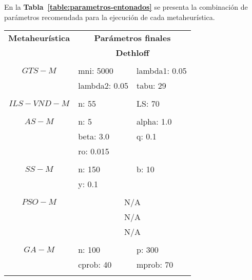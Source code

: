En la \textbf{Tabla~\ref{table:parametros-entonados}} se presenta la combinación de parámetros recomendada para la ejecución de cada metaheurística.\\


\begin{table}[h]
\centering
\caption{Parámetros finales}
\label{table:parametros-entonados}
\begin{minipage}[ht]{0.386\linewidth}
\begin{table}[H]
\centering
\footnotesize
\begin{tabular}{c || ll}
\hline\hline
\textbf{Metaheurística} & \multicolumn{2}{c|}{\textbf{Parámetros finales}}\\
						& \multicolumn{2}{c|}{\textbf{Dethloff}}\\
\hline\hline\\
\emph{$GTS-M$} & mni: 5000     & lambda1: 0.05\\  
			& lambda2: 0.05 & tabu: 29      \\ [0.7ex]\cline{2-3}\\
\emph{$ILS-VND-M$} & n: 55 & LS: 70  \\ [0.7ex]\cline{2-3}\\
\emph{$AS-M$} & n: 5 		& alpha: 1.0 	\\  
			& beta: 3.0 & q: 0.1		\\
			& ro: 0.015 &	 			\\ [0.7ex]\cline{2-3}\\
\emph{$SS-M$} & n: 150 & b: 10 \\  
			& y: 0.1 & 		 \\ [0.7ex]\cline{2-3}\\
\emph{$PSO-M$} & \multicolumn{2}{c}{N/A} \\
			& \multicolumn{2}{c}{N/A} \\
			& \multicolumn{2}{c}{N/A} \\ [0.7ex]\cline{2-3}\\
\emph{$GA-M$} & n: 100    & p: 300  	 \\  
		   & cprob: 40 & mprob: 70   \\
\\ \hline\hline
\end{tabular}
\end{table}
\end{minipage}
\begin{minipage}[ht]{0.386\linewidth}
\begin{table}[H]
\centering
\footnotesize
\begin{tabular}{|ll}

\end{tabular}
\end{table}
\end{minipage}
\end{table}
